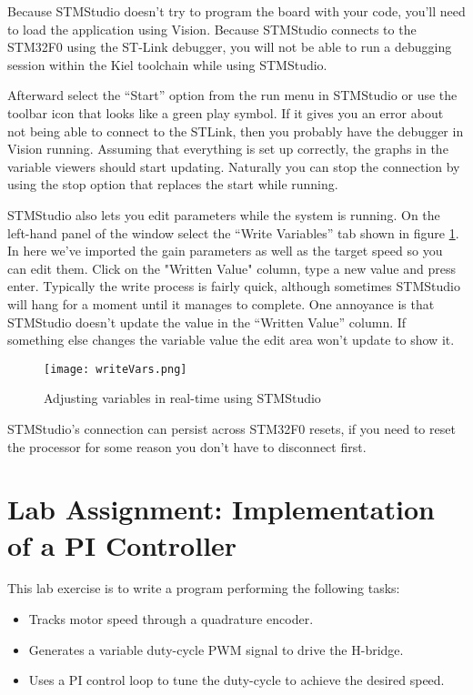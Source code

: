 \documentclass[11pt,fleqn]{book} %
\begin{document}
\noindent Because STMStudio doesn't try to program the board with your code, you'll need to load the application using {\textmu}Vision. Because STMStudio connects to the STM32F0 using the ST-Link debugger, you will not be able to run a debugging session within the Kiel toolchain while using STMStudio. 

\noindent Afterward select the ``Start'' option from the run menu in STMStudio or use the toolbar icon that looks like a green play symbol. If it gives you an error about not being able to connect to the STLink, then you probably have the debugger in {\textmu}Vision running. Assuming that everything is set up correctly, the graphs in the variable viewers should start updating. Naturally you can stop the connection by using the stop option that replaces the start while running.

STMStudio also lets you edit parameters while the system is running. On the left-hand panel of the window select the ``Write Variables'' tab shown in figure \ref{writeVars}. In here we've imported the gain parameters as well as the target speed so you can edit them. Click on the "Written Value" column, type a new value and press enter. Typically the write process is fairly quick, although sometimes STMStudio will hang for a moment until it manages to complete. One annoyance is that STMStudio doesn't update the value in the ``Written Value'' column. If something else changes the variable value the edit area won't update to show it. 


\begin{figure}[tb]
    \centering\texttt{[image: writeVars.png]}
    \caption{Adjusting variables in real-time using STMStudio}
    \label{writeVars}
\end{figure}

STMStudio's connection can persist across STM32F0 resets, if you need to reset the processor for some reason you don't have to disconnect first.


\newpage
{}
\section{Lab Assignment: Implementation of a PI Controller}

This lab exercise is to write a program performing the following tasks:
\begin{itemize}
    \item Tracks motor speed through a quadrature encoder.
    \item Generates a variable duty-cycle PWM signal to drive the H-bridge.
    \item Uses a PI control loop to tune the duty-cycle to achieve the desired speed.
\end{itemize}
\end{document}
